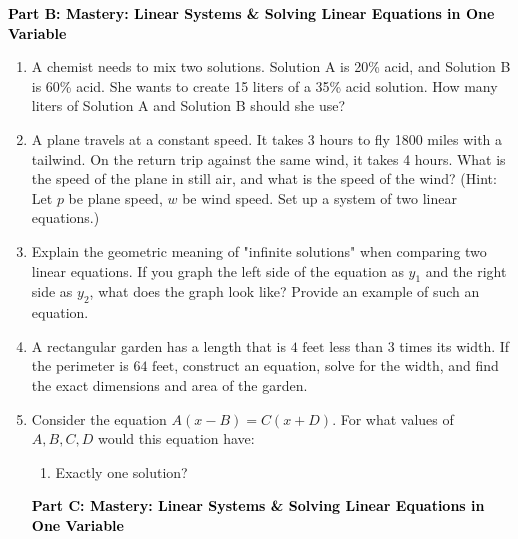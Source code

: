 \documentclass[12pt, letterpaper, fleqn]{article}
\begin{document}
\newpage

\begin{tcolorbox}[colback=customteal!20]
\large\textcolor{black}{\textbf{Part B: Mastery: Linear Systems & Solving Linear Equations in One Variable}}
\end{tcolorbox}

\vspace{3mm}

\begin{enumerate}[itemsep=5.5cm, leftmargin=0.6cm, resume]
\item A chemist needs to mix two solutions. Solution A is 20\% acid, and Solution B is 60\% acid. She wants to create 15 liters of a 35\% acid solution. How many liters of Solution A and Solution B should she use?
\vspace{4cm}
\item A plane travels at a constant speed. It takes 3 hours to fly 1800 miles with a tailwind. On the return trip against the same wind, it takes 4 hours. What is the speed of the plane in still air, and what is the speed of the wind? (Hint: Let $p$ be plane speed, $w$ be wind speed. Set up a system of two linear equations.)
\vspace{4cm}
\item Explain the geometric meaning of "infinite solutions" when comparing two linear equations. If you graph the left side of the equation as $y_1$ and the right side as $y_2$, what does the graph look like? Provide an example of such an equation.
\vspace{4cm}
\item A rectangular garden has a length that is $4\text{ feet}$ less than 3 times its width. If the perimeter is $64\text{ feet}$, construct an equation, solve for the width, and find the exact dimensions and area of the garden.
\vspace{3cm}
\item Consider the equation $A(x-B) = C(x+D)$. For what values of $A, B, C, D$ would this equation have:
    \begin{enumerate}[label=(\alph*), itemsep=0.5cm]
\item Exactly one solution?
\end{enumerate}

\newpage

\begin{tcolorbox}[colback=customteal!20]
\large\textcolor{black}{\textbf{Part C: Mastery: Linear Systems & Solving Linear Equations in One Variable}}
\end{tcolorbox}


\end{enumerate}
\end{document}
